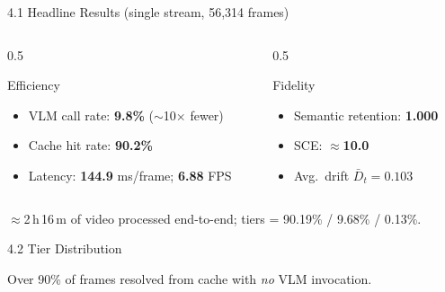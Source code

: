 \documentclass[11pt,aspectratio=169]{beamer}
\begin{document}
\begin{frame}{4.1 Headline Results (single stream, 56{,}314 frames)}
\begin{columns}[T]
\begin{column}{0.5\textwidth}
\begin{block}{Efficiency}
\begin{itemize}
  \item VLM call rate: \alert{\textbf{9.8\%}} ($\sim$10$\times$ fewer)
  \item Cache hit rate: \alert{\textbf{90.2\%}}
  \item Latency: \textbf{144.9} ms/frame; \textbf{6.88} FPS
\end{itemize}
\end{block}
\end{column}
\begin{column}{0.5\textwidth}
\begin{block}{Fidelity}
\begin{itemize}
  \item Semantic retention: \alert{\textbf{1.000}}
  \item SCE: \alert{$\boldsymbol{\approx}$\textbf{10.0}}
  \item Avg.\ drift $\bar{D}_t = 0.103$
\end{itemize}
\end{block}
\end{column}
\end{columns}
\vspace{2mm}
\centering\footnotesize $\approx$2\,h\,16\,m of video processed end-to-end; tiers = 90.19\% / 9.68\% / 0.13\%.
\end{frame}

\begin{frame}{4.2 Tier Distribution}
\centering
{}

\footnotesize Over 90\% of frames resolved from cache with \emph{no} VLM invocation.
\end{frame}
\end{document}
